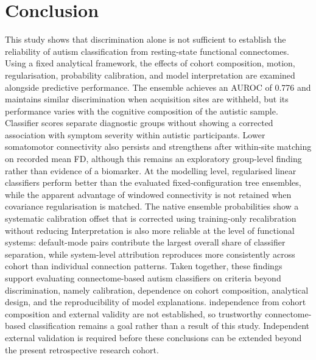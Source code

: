 \section{Conclusion}
\label{sec:conclusion}

This study shows that discrimination alone is not sufficient to establish the reliability of autism classification from resting-state functional connectomes. Using a fixed analytical framework, the effects of cohort composition, motion, regularisation, probability calibration, and model interpretation are examined alongside predictive performance. The ensemble achieves an AUROC of 0.776 and maintains similar discrimination when acquisition sites are withheld, but its performance varies with the cognitive composition of the autistic sample. Classifier scores separate diagnostic groups without showing a corrected association with symptom severity within autistic participants. Lower somatomotor connectivity also persists and strengthens after within-site matching on recorded mean FD, although this remains an exploratory group-level finding rather than evidence of a biomarker. At the modelling level, regularised linear classifiers perform better than the evaluated fixed-configuration tree ensembles, while the apparent advantage of windowed connectivity is not retained when covariance regularisation is matched. The native ensemble probabilities show a systematic calibration offset that is corrected using training-only recalibration without reducing  Interpretation is also more reliable at the level of functional systems: default-mode pairs contribute the largest overall share of classifier separation, while system-level attribution reproduces more consistently across cohort  than individual connection patterns. Taken together, these findings support evaluating connectome-based autism classifiers on criteria beyond discrimination, namely calibration, dependence on cohort composition, analytical design, and the reproducibility of model explanations.  independence from cohort composition and external validity are not established, so trustworthy connectome-based classification remains a goal rather than a result of this study. Independent external validation is required before these conclusions can be extended beyond the present retrospective research cohort.